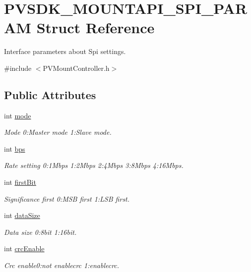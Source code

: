 \hypertarget{struct_p_v_s_d_k___m_o_u_n_t_a_p_i___s_p_i___p_a_r_a_m}{}\section{P\+V\+S\+D\+K\+\_\+\+M\+O\+U\+N\+T\+A\+P\+I\+\_\+\+S\+P\+I\+\_\+\+P\+A\+R\+AM Struct Reference}
\label{struct_p_v_s_d_k___m_o_u_n_t_a_p_i___s_p_i___p_a_r_a_m}


Interface parameters about Spi settings.  




{\ttfamily \#include $<$P\+V\+Mount\+Controller.\+h$>$}

\subsection*{Public Attributes}
\begin{DoxyCompactItemize}
\item 
int \hyperlink{struct_p_v_s_d_k___m_o_u_n_t_a_p_i___s_p_i___p_a_r_a_m_ad9dc19c9a6f1ac9fe4ce629b609fc6b5}{mode}
\begin{DoxyCompactList}\small\item\em Mode 0\+:Master mode 1\+:Slave mode. \end{DoxyCompactList}\item 
int \hyperlink{struct_p_v_s_d_k___m_o_u_n_t_a_p_i___s_p_i___p_a_r_a_m_a948623a0d1a925544e48fc64e6c3ace2}{bps}
\begin{DoxyCompactList}\small\item\em Rate setting 0\+:1\+Mbps 1\+:2\+Mbps 2\+:4\+Mbps 3\+:8\+Mbps 4\+:16\+Mbps. \end{DoxyCompactList}\item 
int \hyperlink{struct_p_v_s_d_k___m_o_u_n_t_a_p_i___s_p_i___p_a_r_a_m_aebfc3e3335c7d66317e3cf0ef75791c5}{first\+Bit}
\begin{DoxyCompactList}\small\item\em Significance first 0\+:M\+SB first 1\+:L\+SB first. \end{DoxyCompactList}\item 
int \hyperlink{struct_p_v_s_d_k___m_o_u_n_t_a_p_i___s_p_i___p_a_r_a_m_a9aa6df568178f93b5d7e65ccea3b4d2c}{data\+Size}
\begin{DoxyCompactList}\small\item\em Data size 0\+:8bit 1\+:16bit. \end{DoxyCompactList}\item 
int \hyperlink{struct_p_v_s_d_k___m_o_u_n_t_a_p_i___s_p_i___p_a_r_a_m_afd278ab114519f1d2285046820631eb7}{crc\+Enable}
\begin{DoxyCompactList}\small\item\em Crc enable0\+:not enablecrc 1\+:enablecrc. \end{DoxyCompactList}\end{DoxyCompactItemize}


